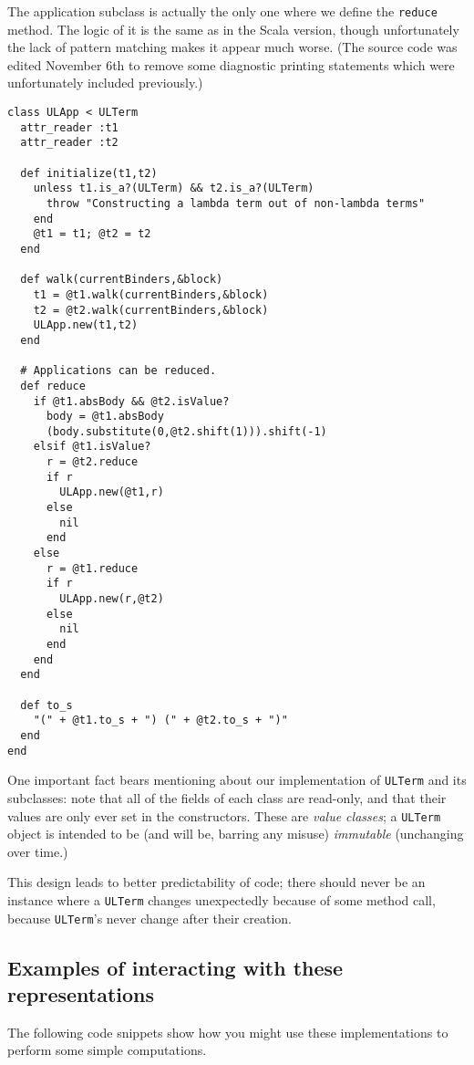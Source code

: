 \documentclass[11pt]{article}
\theoremstyle{definition}
\begin{document}
The application subclass is actually the only one
where we define the \texttt{reduce} method.
The logic of it is the same as in the Scala version,
though unfortunately the lack of pattern matching
makes it appear much worse.
(The source code was edited November 6th to remove some
diagnostic printing statements which were unfortunately included previously.)
\begin{verbatim}
class ULApp < ULTerm
  attr_reader :t1
  attr_reader :t2

  def initialize(t1,t2)
    unless t1.is_a?(ULTerm) && t2.is_a?(ULTerm)
      throw "Constructing a lambda term out of non-lambda terms"
    end
    @t1 = t1; @t2 = t2
  end
  
  def walk(currentBinders,&block)
    t1 = @t1.walk(currentBinders,&block)
    t2 = @t2.walk(currentBinders,&block)
    ULApp.new(t1,t2)
  end

  # Applications can be reduced.
  def reduce
    if @t1.absBody && @t2.isValue?
      body = @t1.absBody
      (body.substitute(0,@t2.shift(1))).shift(-1)
    elsif @t1.isValue?
      r = @t2.reduce
      if r
        ULApp.new(@t1,r)
      else
        nil
      end
    else
      r = @t1.reduce
      if r
        ULApp.new(r,@t2)
      else
        nil
      end
    end
  end

  def to_s
    "(" + @t1.to_s + ") (" + @t2.to_s + ")" 
  end
end
\end{verbatim}

One important fact bears mentioning about our implementation
of \texttt{ULTerm} and its subclasses: note that all of the fields
of each class are read-only, and that their values
are only ever set in the constructors.
These are \emph{value classes}; a \texttt{ULTerm} object is intended to be
(and will be, barring any misuse) \emph{immutable} (unchanging over time.)

This design leads to better predictability of code;
there should never be an instance where a \texttt{ULTerm} changes unexpectedly
because of some method call, because \texttt{ULTerm}'s never change
after their creation.

\subsection*{Examples of interacting with these representations}
\label{sec:orgdca627c}
The following code snippets show how you might use
these implementations to perform some simple computations.
\end{document}
